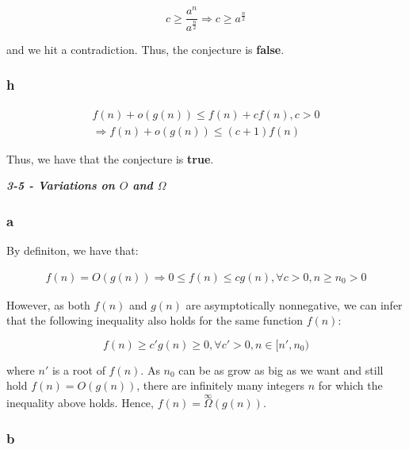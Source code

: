 \documentclass[8pt,a4paper]{article}
\begin{document}
\begin{equation*}
  c \geq \frac{a^{n}}{a^{\frac{n}{2}}} \Rightarrow c \geq a^{\frac{n}{2}}
\end{equation*}

and we hit a contradiction. Thus, the conjecture is \textbf{false}.

\subsubsection*{h}

\begin{equation*}
  \begin{split}
    f(n) + o(g(n)) \leq f(n) + cf(n), c > 0 \\
    \Rightarrow f(n) + o(g(n)) \leq (c + 1)f(n)
  \end{split}
\end{equation*}

  Thus, we have that the conjecture is \textbf{true}.

\begin{framed}
  \textbf{\textit{3-5 - Variations on $O$ and $\Omega$}}
\end{framed}

\subsubsection*{a}

  By definiton, we have that:

\begin{equation*}
  \begin{split}
    f(n) = O(g(n)) \Rightarrow 0 \leq f(n) \leq c g(n), \forall c > 0, n \geq n_{0} > 0
  \end{split}
\end{equation*}

  However, as both $f(n)$ and $g(n)$ are asymptotically nonnegative, we can
infer that the following inequality also holds for the same function $f(n)$:

\begin{equation*}
  f(n) \geq c' g(n) \geq 0, \forall c' > 0, n \in [n', n_{0})
\end{equation*}

where $n'$ is a root of $f(n)$. As $n_{0}$ can be as grow as big as we want
and still hold $f(n) = O(g(n))$, there are infinitely many integers $n$ for
which the inequality above holds. Hence, $f(n) = \overset{\infty}{\Omega}(g(n))$.

\subsubsection*{b}
\end{document}
